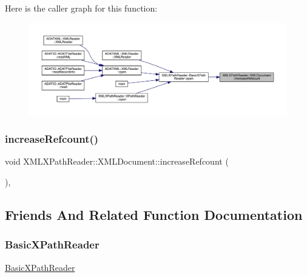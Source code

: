 Here is the caller graph for this function\+:\nopagebreak
\begin{figure}[H]
\begin{center}
\leavevmode
\includegraphics[width=350pt]{d5/dfd/classXMLXPathReader_1_1XMLDocument_ac39670aea17809a726dc6a2cc91c9710_icgraph}
\end{center}
\end{figure}
\mbox{\label{classXMLXPathReader_1_1XMLDocument_ac39670aea17809a726dc6a2cc91c9710}} 
\subsubsection{\texorpdfstring{increaseRefcount()}{increaseRefcount()}\hspace{0.1cm}{\footnotesize\ttfamily [2/2]}}
{\footnotesize\ttfamily void X\+M\+L\+X\+Path\+Reader\+::\+X\+M\+L\+Document\+::increase\+Refcount (\begin{DoxyParamCaption}{ }\end{DoxyParamCaption})\hspace{0.3cm}{\ttfamily [inline]}, {\ttfamily [protected]}}



\subsection{Friends And Related Function Documentation}
\mbox{\label{classXMLXPathReader_1_1XMLDocument_aab456070fa37ace014ac68d8cfd00c68}} 
\subsubsection{\texorpdfstring{BasicXPathReader}{BasicXPathReader}}
{\footnotesize\ttfamily \mbox{\hyperlink{classXMLXPathReader_1_1BasicXPathReader}{Basic\+X\+Path\+Reader}}\hspace{0.3cm}{\ttfamily [friend]}}



